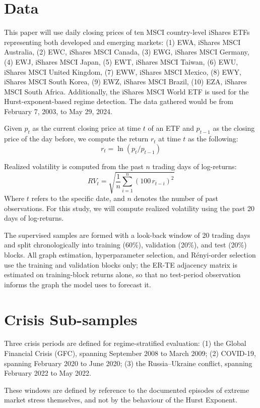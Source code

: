 \documentclass[12pt,oneside]{report}
\begin{document}
\section{Data}

This paper will use daily closing prices of ten MSCI country-level
iShares ETFs representing both developed and emerging markets: (1) EWA,
iShares MSCI Australia, (2) EWC, iShares MSCI Canada, (3) EWG, iShares
MSCI Germany, (4) EWJ, iShares MSCI Japan, (5) EWT, iShares MSCI Taiwan,
(6) EWU, iShares MSCI United Kingdom, (7) EWW, iShares MSCI Mexico, (8)
EWY, iShares MSCI South Korea, (9) EWZ, iShares MSCI Brazil, (10) EZA,
iShares MSCI South Africa. Additionally, the iShares MSCI World ETF is
used for the Hurst-exponent-based regime detection. The data gathered
would be from February 7, 2003, to May 29, 2024.

Given $p_{t}$ as the current closing price at time $t$ of an ETF and
$p_{t-1}$ as the closing price of the day before, we compute the return
$r_{t}$ at time $t$ as the following:
\[
  r_{t} = \ln\left(p_{t} / p_{t-1}\right)
\]

Realized volatility is computed from the past $n$ trading days of
log-returns:
\[
  RV_{t} = \sqrt{\frac{1}{n}\sum_{i=1}^{n}\left(100\, r_{t-i}\right)^{2}}
\]
Where $t$ refers to the specific date, and $n$ denotes the number of
past observations. For this study, we will compute realized volatility
using the past 20 days of log-returns.

The supervised samples are formed with a look-back window of 20 trading
days and split chronologically into training (60\%), validation (20\%),
and test (20\%) blocks. All graph estimation, hyperparameter selection,
and Rényi-order selection use the training and validation blocks only;
the ER-TE adjacency matrix is estimated on training-block returns alone,
so that no test-period observation informs the graph the model uses to
forecast it.

\section{Crisis Sub-samples}

Three crisis periods are defined for regime-stratified evaluation: (1)
the Global Financial Crisis (GFC), spanning September 2008 to March
2009; (2) COVID-19, spanning February 2020 to June 2020; (3) the
Russia--Ukraine conflict, spanning February 2022 to May 2022.

These windows are defined by reference to the documented episodes of
extreme market stress themselves, and not by the behaviour of the Hurst
Exponent.
\end{document}
